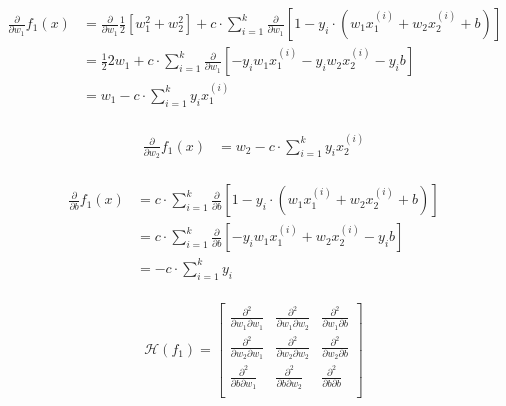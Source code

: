 \documentclass[12pt,landscape]{article}
\begin{document}
\begin{align}
\frac{\partial}{\partial w_1} f_1(x) &= \frac{\partial}{\partial w_1}\frac{1}{2} \left[ w_1^2 + w_2^2 \right] + c \cdot \sum\limits_{i=1}^k  \frac{\partial}{\partial w_1} \left[ 1-y_i \cdot \left( w_1  x_1^{(i)} +  w_2  x_2^{(i)} + b \right) \right]\\
&= \frac{1}{2} 2w_1 + c \cdot \sum\limits_{i=1}^k  \frac{\partial}{\partial w_1} \left[ -y_i w_1  x_1^{(i)} -y_i  w_2  x_2^{(i)}  -y_ib \right]\\
&= w_1 - c \cdot \sum\limits_{i=1}^k y_i  x_1^{(i)}\\
\end{align}
\newcommand{\lOneLossDwOne}{w_1 - c \cdot \sum\limits_{i=1}^k y_i  x_1^{(i)}}

\begin{align}
\frac{\partial}{\partial w_2} f_1(x) &= w_2  - c \cdot \sum\limits_{i=1}^k y_i  x_2^{(i)} \\
\end{align}

\newcommand{\lOneLossDwTwo}{w_2  - c \cdot \sum\limits_{i=1}^k y_i  x_2^{(i)} }

\begin{align}
\frac{\partial}{\partial b} f_1(x) &= c \cdot \sum\limits_{i=1}^k  \frac{\partial}{\partial b} \left[ 1-y_i \cdot \left( w_1  x_1^{(i)} + w_2  x_2^{(i)} + b \right) \right]\\
&= c \cdot \sum\limits_{i=1}^k  \frac{\partial}{\partial b} \left[ -y_i w_1  x_1^{(i)} +  w_2  x_2^{(i)} -y_ib \right]\\
&= - c \cdot \sum\limits_{i=1}^k y_i\\
\end{align}


\begin{equation}
\mathcal{H}(f_1) = \begin{bmatrix}
\frac{\partial^2}{\partial w_1 \partial w_1} & \frac{\partial^2}{\partial w_1 \partial w_2} & \frac{\partial^2}{\partial w_1 \partial b}\\
\frac{\partial^2}{\partial w_2 \partial w_1} & \frac{\partial^2}{\partial w_2 \partial w_2} & \frac{\partial^2}{\partial w_2 \partial b}\\
\frac{\partial^2}{\partial b \partial w_1} & \frac{\partial^2}{\partial b \partial w_2} & \frac{\partial^2}{\partial b \partial b}\\
\end{bmatrix}
\end{equation}
\end{document}

